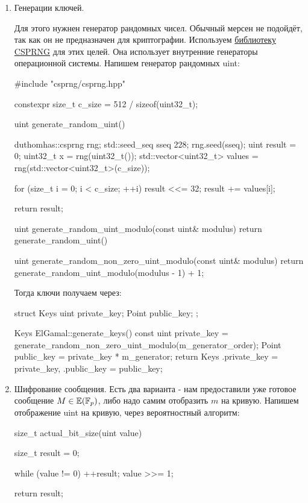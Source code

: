 \begin{enumerate}
  \item Генерации ключей.

  Для этого нужнен генератор рандомных чисел. Обычный мерсен не подойдёт, так как он не предназначен для криптографии. Используем \href{https://github.com/Duthomhas/CSPRNG}{библиотеку CSPRNG} для этих целей. Она использует внутренние генераторы операционной системы. Напишем генератор рандомных uint:
  \begin{cppcode}
#include "csprng/csprng.hpp"

constexpr size_t c_size = 512 / sizeof(uint32_t);

uint generate_random_uint() {
    duthomhas::csprng rng;
    std::seed_seq sseq {228};
    rng.seed(sseq);
    uint result = 0;
    uint32_t x = rng(uint32_t());
    std::vector<uint32_t> values = rng(std::vector<uint32_t>(c_size));

    for (size_t i = 0; i < c_size; ++i) {
        result <<= 32;
        result += values[i];
    }

    return result;
}

uint generate_random_uint_modulo(const uint& modulus) {
    return generate_random_uint() %
}

uint generate_random_non_zero_uint_modulo(const uint& modulus) {
    return generate_random_uint_modulo(modulus - 1) + 1;
}
  \end{cppcode}

  Тогда ключи получаем через:
  \begin{cppcode}
struct Keys {
    uint private_key;
    Point public_key;
};

Keys ElGamal::generate_keys() const {
    uint private_key = generate_random_non_zero_uint_modulo(m_generator_order);
    Point public_key = private_key * m_generator;
    return Keys {.private_key = private_key, .public_key = public_key};
}
  \end{cppcode}
  \item Шифрование сообщения. Есть два варианта - нам предоставили уже готовое сообщение $M\in\mathbb E(\mathbb F_p)$, либо надо самим отобразить $m$ на кривую. Напишем отображение uint на кривую, через вероятностный алгоритм:
  \begin{cppcode}
size_t actual_bit_size(uint value) {
    size_t result = 0;

    while (value != 0) {
        ++result;
        value >>= 1;
    }

    return result;
}


\end{cppcode}
\end{enumerate}
